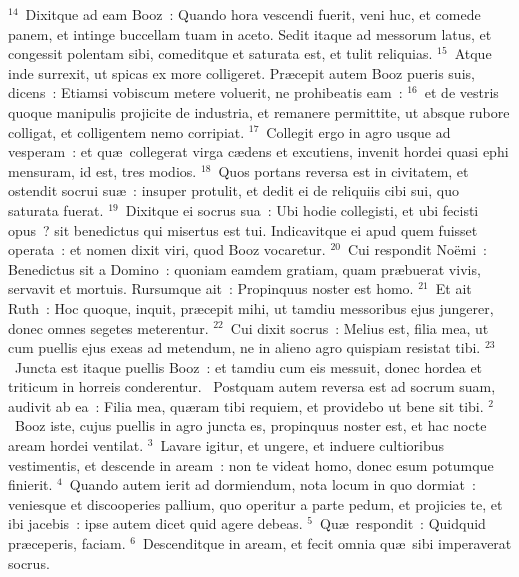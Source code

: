 ${}^{14}$~Dixitque ad eam Booz~: Quando hora vescendi fuerit, veni huc, et comede panem, et intinge buccellam tuam in aceto. Sedit itaque ad messorum latus, et congessit polentam sibi, comeditque et saturata est, et tulit reliquias.
${}^{15}$~Atque inde surrexit, ut spicas ex more colligeret. Pr\ae cepit autem Booz pueris suis, dicens~: Etiamsi vobiscum metere voluerit, ne prohibeatis eam~:
${}^{16}$~et de vestris quoque manipulis projicite de industria, et remanere permittite, ut absque rubore colligat, et colligentem nemo corripiat.
${}^{17}$~Collegit ergo in agro usque ad vesperam~: et qu\ae\ collegerat virga c\ae dens et excutiens, invenit hordei quasi ephi mensuram, id est, tres modios.
${}^{18}$~Quos portans reversa est in civitatem, et ostendit socrui su\ae~: insuper protulit, et dedit ei de reliquiis cibi sui, quo saturata fuerat.
${}^{19}$~Dixitque ei socrus sua~: Ubi hodie collegisti, et ubi fecisti opus~? sit benedictus qui misertus est tui. Indicavitque ei apud quem fuisset operata~: et nomen dixit viri, quod Booz vocaretur.
${}^{20}$~Cui respondit No\"emi~: Benedictus sit a Domino~: quoniam eamdem gratiam, quam pr\ae buerat vivis, servavit et mortuis. Rursumque ait~: Propinquus noster est homo.
${}^{21}$~Et ait Ruth~: Hoc quoque, inquit, pr\ae cepit mihi, ut tamdiu messoribus ejus jungerer, donec omnes segetes meterentur.
${}^{22}$~Cui dixit socrus~: Melius est, filia mea, ut cum puellis ejus exeas ad metendum, ne in alieno agro quispiam resistat tibi.
${}^{23}$~Juncta est itaque puellis Booz~: et tamdiu cum eis messuit, donec hordea et triticum in horreis conderentur.
~Postquam autem reversa est ad socrum suam, audivit ab ea~: Filia mea, qu\ae ram tibi requiem, et providebo ut bene sit tibi.
${}^{2}$~Booz iste, cujus puellis in agro juncta es, propinquus noster est, et hac nocte aream hordei ventilat.
${}^{3}$~Lavare igitur, et ungere, et induere cultioribus vestimentis, et descende in aream~: non te videat homo, donec esum potumque finierit.
${}^{4}$~Quando autem ierit ad dormiendum, nota locum in quo dormiat~: veniesque et discooperies pallium, quo operitur a parte pedum, et projicies te, et ibi jacebis~: ipse autem dicet quid agere debeas.
${}^{5}$~Qu\ae\ respondit~: Quidquid pr\ae ceperis, faciam.
${}^{6}$~Descenditque in aream, et fecit omnia qu\ae\ sibi imperaverat socrus.



